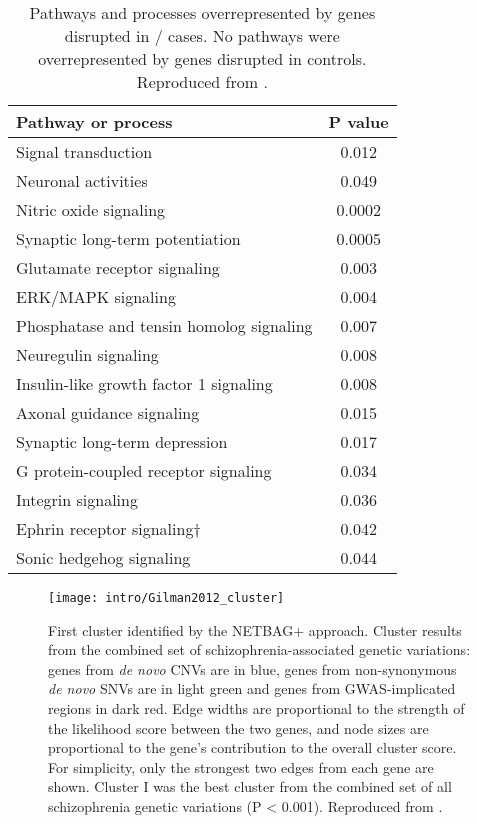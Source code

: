 \begin{table}
\centering
\begin{tabular}{l c}
\textbf{Pathway or process} & \textbf{P value} \\
\hline
Signal transduction & 0.012 \\
Neuronal activities & 0.049 \\
Nitric oxide signaling & 0.0002 \\
Synaptic long-term potentiation & 0.0005 \\
Glutamate receptor signaling & 0.003 \\
ERK/MAPK signaling & 0.004 \\
Phosphatase and tensin homolog signaling & 0.007 \\
Neuregulin signaling & 0.008 \\
Insulin-like growth factor 1 signaling & 0.008 \\
Axonal guidance signaling & 0.015 \\
Synaptic long-term depression & 0.017 \\
G protein-coupled receptor signaling & 0.034 \\
Integrin signaling & 0.036 \\
Ephrin receptor signaling† & 0.042 \\
Sonic hedgehog signaling & 0.044 \\
\end{tabular}
\caption[Pathways implicated in \scz/]{Pathways and processes overrepresented by genes disrupted in \scz/ cases. No pathways were overrepresented by genes disrupted in controls.
Reproduced from \citet{Walsh2008}.}
\label{table:intro:scz:pathways}
\end{table}

\begin{figure}
	\centering
	\texttt{[image: intro/Gilman2012\_cluster]}
	\caption[First cluster identified by the NETBAG+ approach]{First cluster identified by the NETBAG+ approach.
	Cluster results from the combined set of schizophrenia-associated genetic variations: genes from \emph{de novo} CNVs are in blue, genes from non-synonymous \emph{de novo} SNVs are in light green and genes from GWAS-implicated regions in dark red. Edge widths are proportional to the strength of the likelihood score between the two genes, and node sizes are proportional to the gene’s contribution to the overall cluster score. For simplicity, only the strongest two edges from each gene are shown. Cluster I was the best cluster from the combined set of all schizophrenia genetic variations (P < 0.001).
	Reproduced from \citet{Gilman2012}.}
	\label{fig:intro:scz:cluster}
\end{figure}

